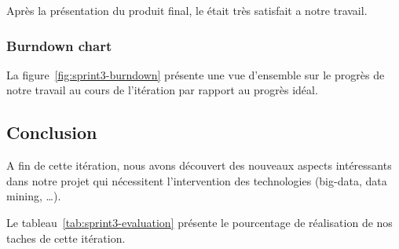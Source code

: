 Après la présentation du produit final, le  était très satisfait
a notre travail.

\subsubsection{Burndown chart}

La figure~\ref{fig:sprint3-burndown} présente une vue d'ensemble sur le progrès
de notre travail au cours de l'itération par rapport au progrès idéal.



\subsection{Conclusion}

A fin de cette itération, nous avons découvert des nouveaux aspects intéressants dans notre projet
qui nécessitent l'intervention des technologies (big-data, data mining, \ldots).

Le tableau~\ref{tab:sprint3-evaluation} présente le pourcentage de
réalisation de nos taches de cette itération.

